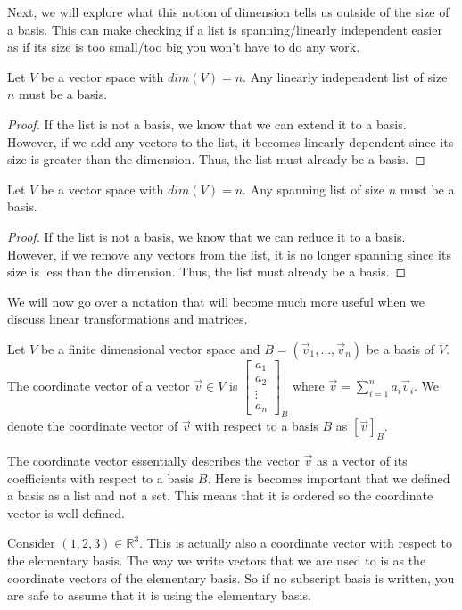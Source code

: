 Next, we will explore what this notion of dimension tells us outside of the size of a basis. This can make checking if a list is spanning/linearly independent easier as if its size is too small/too big you won't have to do any work.
\begin{corollary}
    Let $V$ be a vector space with $dim(V)=n$. Any linearly independent list of size $n$ must be a basis.
\end{corollary}
\begin{proof}
    If the list is not a basis, we know that we can extend it to a basis. However, if we add any vectors to the list, it becomes linearly dependent since its size is greater than the dimension. Thus, the list must already be a basis.
\end{proof}
\begin{corollary}
    Let $V$ be a vector space with $dim(V)=n$. Any spanning list of size $n$ must be a basis.
\end{corollary}
\begin{proof}
    If the list is not a basis, we know that we can reduce it to a basis. However, if we remove any vectors from the list, it is no longer spanning since its size is less than the dimension. Thus, the list must already be a basis.
\end{proof}
We will now go over a notation that will become much more useful when we discuss linear transformations and matrices. 
\begin{definition}
    Let $V$ be a finite dimensional vector space and $B=(\vec{v}_1,\ldots,\vec{v}_n)$ be a basis of $V$. The coordinate vector of a vector $\vec{v}\in V$ is $\left[\begin{smallmatrix}
        a_1 \\ a_2 \\ \vdots \\ a_n
    \end{smallmatrix}\right]_B$ where $\vec{v}=\sum_{i=1}^n a_i\vec{v}_i$. We denote the coordinate vector of $\vec{v}$ with respect to a basis $B$ as $[\vec{v}]_B$.
\end{definition}
\begin{remark}
    The coordinate vector essentially describes the vector $\vec{v}$ as a vector of its coefficients with respect to a basis $B$. Here is becomes important that we defined a basis as a list and not a set. This means that it is ordered so the coordinate vector is well-defined.
\end{remark}
\begin{remark}
    Consider $(1,2,3)\in\mathbb{R}^3$. This is actually also a coordinate vector with respect to the elementary basis. The way we write vectors that we are used to is as the coordinate vectors of the elementary basis. So if no subscript basis is written, you are safe to assume that it is using the elementary basis.
\end{remark}
